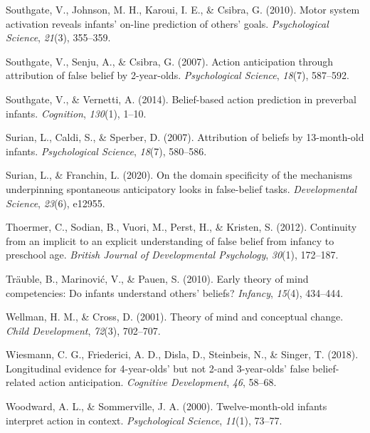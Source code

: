\documentclass[
  english,
  man,floatsintext]{apa6}
\newlength{\cslhangindent}
\newlength{\cslentryspacingunit} %
\newenvironment{CSLReferences}[2] %
 {%
  \setlength{\parindent}{0pt}
  \ifodd #1
  \let\oldpar\par
  \def\par{\hangindent=\cslhangindent\oldpar}
  \fi
  \setlength{\parskip}{#2\cslentryspacingunit}
 }%
 {}
\begin{document}
\begin{CSLReferences}{1}{0}
\leavevmode{}%
Southgate, V., Johnson, M. H., Karoui, I. E., \& Csibra, G. (2010). Motor system activation reveals infants' on-line prediction of others' goals. \emph{Psychological Science}, \emph{21}(3), 355--359.

\leavevmode{}%
Southgate, V., Senju, A., \& Csibra, G. (2007). Action anticipation through attribution of false belief by 2-year-olds. \emph{Psychological Science}, \emph{18}(7), 587--592.

\leavevmode{}%
Southgate, V., \& Vernetti, A. (2014). Belief-based action prediction in preverbal infants. \emph{Cognition}, \emph{130}(1), 1--10.

\leavevmode{}%
Surian, L., Caldi, S., \& Sperber, D. (2007). Attribution of beliefs by 13-month-old infants. \emph{Psychological Science}, \emph{18}(7), 580--586.

\leavevmode{}%
Surian, L., \& Franchin, L. (2020). On the domain specificity of the mechanisms underpinning spontaneous anticipatory looks in false-belief tasks. \emph{Developmental Science}, \emph{23}(6), e12955.

\leavevmode{}%
Thoermer, C., Sodian, B., Vuori, M., Perst, H., \& Kristen, S. (2012). Continuity from an implicit to an explicit understanding of false belief from infancy to preschool age. \emph{British Journal of Developmental Psychology}, \emph{30}(1), 172--187.

\leavevmode{}%
Träuble, B., Marinović, V., \& Pauen, S. (2010). Early theory of mind competencies: Do infants understand others' beliefs? \emph{Infancy}, \emph{15}(4), 434--444.

\leavevmode{}%
Wellman, H. M., \& Cross, D. (2001). Theory of mind and conceptual change. \emph{Child Development}, \emph{72}(3), 702--707.

\leavevmode{}%
Wiesmann, C. G., Friederici, A. D., Disla, D., Steinbeis, N., \& Singer, T. (2018). Longitudinal evidence for 4-year-olds' but not 2-and 3-year-olds' false belief-related action anticipation. \emph{Cognitive Development}, \emph{46}, 58--68.

\leavevmode{}%
Woodward, A. L., \& Sommerville, J. A. (2000). Twelve-month-old infants interpret action in context. \emph{Psychological Science}, \emph{11}(1), 73--77.

\end{CSLReferences}

\endgroup
\end{document}
